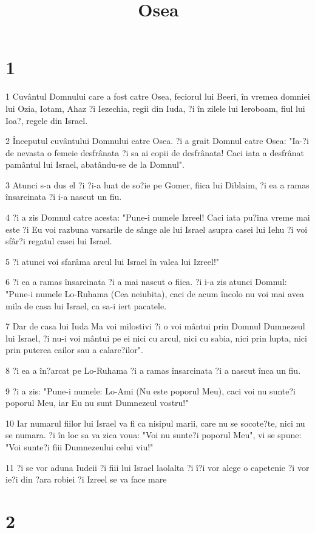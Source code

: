 

\title{Osea}


\chapter{1}

\par 1 Cuvântul Domnului care a fost catre Osea, feciorul lui Beeri, în vremea domniei lui Ozia, Iotam, Ahaz ?i Iezechia, regii din Iuda, ?i în zilele lui Ieroboam, fiul lui Ioa?, regele din Israel.
\par 2 Începutul cuvântului Domnului catre Osea. ?i a grait Domnul catre Osea: "Ia-?i de nevasta o femeie desfrânata ?i sa ai copii de desfrânata! Caci iata a desfrânat pamântul lui Israel, abatându-se de la Domnul".
\par 3 Atunci s-a dus el ?i ?i-a luat de so?ie pe Gomer, fiica lui Diblaim, ?i ea a ramas însarcinata ?i i-a nascut un fiu.
\par 4 ?i a zis Domnul catre acesta: "Pune-i numele Izreel! Caci iata pu?ina vreme mai este ?i Eu voi razbuna varsarile de sânge ale lui Israel asupra casei lui Iehu ?i voi sfâr?i regatul casei lui Israel.
\par 5 ?i atunci voi sfarâma arcul lui Israel în valea lui Izreel!"
\par 6 ?i ea a ramas însarcinata ?i a mai nascut o fiica. ?i i-a zis atunci Domnul: "Pune-i numele Lo-Ruhama (Cea neiubita), caci de acum încolo nu voi mai avea mila de casa lui Israel, ca sa-i iert pacatele.
\par 7 Dar de casa lui Iuda Ma voi milostivi ?i o voi mântui prin Domnul Dumnezeul lui Israel, ?i nu-i voi mântui pe ei nici cu arcul, nici cu sabia, nici prin lupta, nici prin puterea cailor sau a calare?ilor".
\par 8 ?i ea a în?arcat pe Lo-Ruhama ?i a ramas însarcinata ?i a nascut înca un fiu.
\par 9 ?i a zis: "Pune-i numele: Lo-Ami (Nu este poporul Meu), caci voi nu sunte?i poporul Meu, iar Eu nu sunt Dumnezeul vostru!"
\par 10 Iar numarul fiilor lui Israel va fi ca nisipul marii, care nu se socote?te, nici nu se numara. ?i în loc sa va zica voua: "Voi nu sunte?i poporul Meu", vi se spune: "Voi sunte?i fiii Dumnezeului celui viu!"
\par 11 ?i se vor aduna Iudeii ?i fiii lui Israel laolalta ?i î?i vor alege o capetenie ?i vor ie?i din ?ara robiei ?i Izreel se va face mare

\chapter{2}

